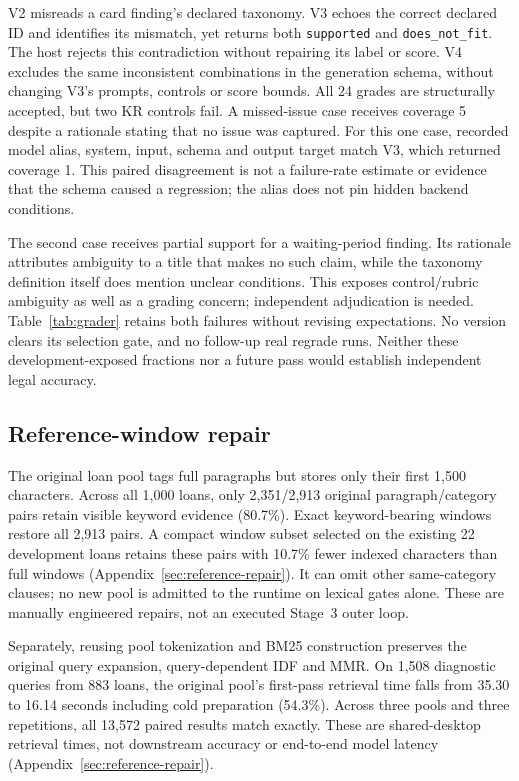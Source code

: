\documentclass[11pt]{article}
\begin{document}
V2 misreads a card finding's declared taxonomy. V3 echoes the correct
declared ID and identifies its mismatch, yet returns both
\texttt{supported} and \texttt{does\_not\_fit}. The host rejects this
contradiction without repairing its label or score.
V4 excludes the same inconsistent combinations in the generation schema,
without changing V3's prompts, controls or score bounds. All 24 grades
are structurally accepted, but two KR controls fail. A missed-issue case
receives coverage 5 despite a rationale stating that no issue was captured.
For this one case, recorded model alias, system, input, schema and output
target match V3, which returned coverage 1. This paired disagreement is
not a failure-rate estimate or evidence that the schema caused a regression;
the alias does not pin hidden backend conditions.

The second case receives partial support for a waiting-period finding.
Its rationale attributes ambiguity to a title that makes no such claim,
while the taxonomy definition itself does mention unclear conditions.
This exposes control/rubric ambiguity as well as a grading concern;
independent adjudication is needed. Table~\ref{tab:grader} retains both
failures without revising expectations. No version clears its selection
gate, and no follow-up real regrade runs. Neither these development-exposed
fractions nor a future pass would establish independent legal accuracy.

\subsection{Reference-window repair}
The original loan pool tags full paragraphs but stores only their first
1,500 characters. Across all 1,000 loans, only 2,351/2,913 original
paragraph/category pairs retain visible keyword evidence (80.7\%).
Exact keyword-bearing windows restore all 2,913 pairs. A compact window
subset selected on the existing 22 development loans retains these pairs
with 10.7\% fewer indexed characters than full windows
(Appendix~\ref{sec:reference-repair}). It can omit other same-category
clauses; no new pool is admitted to the runtime on lexical gates alone.
These are manually engineered repairs, not an executed Stage~3 outer loop.

Separately, reusing pool tokenization and BM25 construction preserves the
original query expansion, query-dependent IDF and MMR. On 1,508 diagnostic
queries from 883 loans, the original pool's first-pass retrieval time falls
from 35.30 to 16.14 seconds including cold preparation (54.3\%). Across
three pools and three repetitions, all 13,572 paired results match exactly.
These are shared-desktop retrieval times, not downstream accuracy or
end-to-end model latency (Appendix~\ref{sec:reference-repair}).
\end{document}
